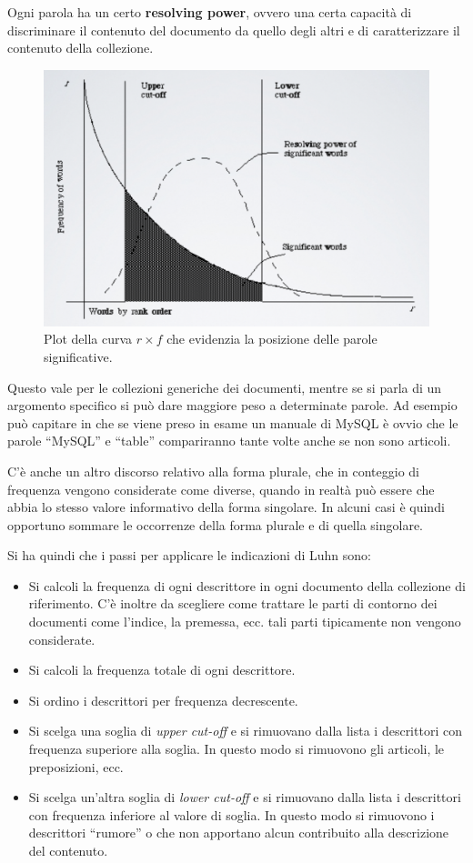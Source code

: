Ogni parola ha un certo \textbf{resolving power}, ovvero una certa capacità di discriminare il contenuto del documento da quello degli altri e di caratterizzare il contenuto della collezione.

\begin{figure}[htbp]
	\centering
	\includegraphics[width=0.55\linewidth]{images/l3-cutoff}
	\caption{Plot della curva $r \times f$ che evidenzia la posizione delle parole significative.}
\end{figure}

Questo vale per le collezioni generiche dei documenti, mentre se si parla di un argomento specifico si può dare maggiore peso a determinate parole. Ad esempio può capitare in che se viene preso in esame un manuale di MySQL è ovvio che le parole ``MySQL'' e  ``table'' compariranno tante volte anche se non sono articoli.

C'è anche un altro discorso relativo alla forma plurale, che in conteggio di frequenza vengono considerate come diverse, quando in realtà può essere che abbia lo stesso valore informativo della forma singolare. In alcuni casi è quindi opportuno sommare le occorrenze della forma plurale e di quella singolare.

Si ha quindi che i passi per applicare le indicazioni di Luhn sono:

\begin{itemize}
	\item Si calcoli la frequenza di ogni descrittore in ogni documento della collezione di riferimento. C'è inoltre da scegliere come trattare le parti di contorno dei documenti come l'indice, la premessa, ecc. tali parti tipicamente non vengono considerate.
	\item Si calcoli la frequenza totale di ogni descrittore.
	\item Si ordino i descrittori per frequenza decrescente.
	\item Si scelga una soglia di \textit{upper cut-off} e si rimuovano dalla lista i descrittori con frequenza superiore alla soglia. In questo modo si rimuovono gli articoli, le preposizioni, ecc.
	\item Si scelga un'altra soglia di \textit{lower cut-off} e si rimuovano dalla lista i descrittori con frequenza inferiore al valore di soglia. In questo modo si rimuovono i descrittori ``rumore''  o che non apportano alcun contribuito alla descrizione del contenuto.
\end{itemize}

